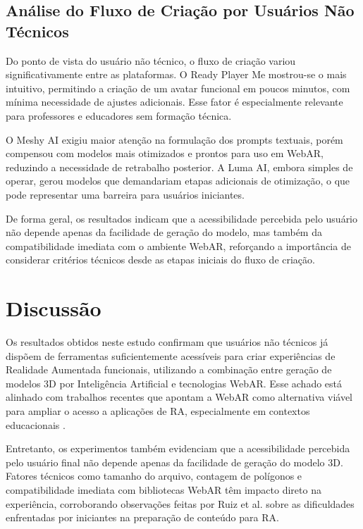 \documentclass[conference]{IEEEtran}
\begin{document}
\subsection{Análise do Fluxo de Criação por Usuários Não Técnicos}

Do ponto de vista do usuário não técnico, o fluxo de criação variou significativamente entre as plataformas. O Ready Player Me mostrou-se o mais intuitivo, permitindo a criação de um avatar funcional em poucos minutos, com mínima necessidade de ajustes adicionais. Esse fator é especialmente relevante para professores e educadores sem formação técnica.

O Meshy AI exigiu maior atenção na formulação dos prompts textuais, porém compensou com modelos mais otimizados e prontos para uso em WebAR, reduzindo a necessidade de retrabalho posterior. A Luma AI, embora simples de operar, gerou modelos que demandariam etapas adicionais de otimização, o que pode representar uma barreira para usuários iniciantes.

De forma geral, os resultados indicam que a acessibilidade percebida pelo usuário não depende apenas da facilidade de geração do modelo, mas também da compatibilidade imediata com o ambiente WebAR, reforçando a importância de considerar critérios técnicos desde as etapas iniciais do fluxo de criação.


\section{Discussão}

Os resultados obtidos neste estudo confirmam que usuários não técnicos já dispõem de ferramentas suficientemente acessíveis para criar experiências de Realidade Aumentada funcionais, utilizando a combinação entre geração de modelos 3D por Inteligência Artificial e tecnologias WebAR. Esse achado está alinhado com trabalhos recentes que apontam a WebAR como alternativa viável para ampliar o acesso a aplicações de RA, especialmente em contextos educacionais \cite{koutsabasis2021webar, fonnet2021review}.

Entretanto, os experimentos também evidenciam que a acessibilidade percebida pelo usuário final não depende apenas da facilidade de geração do modelo 3D. Fatores técnicos como tamanho do arquivo, contagem de polígonos e compatibilidade imediata com bibliotecas WebAR têm impacto direto na experiência, corroborando observações feitas por Ruiz et al. \cite{ruiz2020arbeginner} sobre as dificuldades enfrentadas por iniciantes na preparação de conteúdo para RA.
\end{document}

